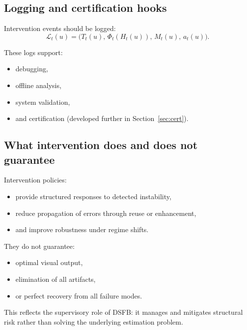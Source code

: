 \documentclass[11pt,letterpaper]{article}
\theoremstyle{gcresult}
\theoremstyle{definition}
\begin{document}

\subsection{Logging and certification hooks}

Intervention events should be logged:
\begin{equation}
\mathcal{L}_t(u)=
\bigl(
T_t(u),\,
\Phi_t(H_t(u)),\,
M_t(u),\,
a_t(u)
\bigr).
\end{equation}

These logs support:
\begin{itemize}[leftmargin=1.5em]
    \item debugging,
    \item offline analysis,
    \item system validation,
    \item and certification (developed further in Section~\ref{sec:cert}).
\end{itemize}


\subsection{What intervention does and does not guarantee}

Intervention policies:
\begin{itemize}[leftmargin=1.5em]
    \item provide structured responses to detected instability,
    \item reduce propagation of errors through reuse or enhancement,
    \item and improve robustness under regime shifts.
\end{itemize}

They do not guarantee:
\begin{itemize}[leftmargin=1.5em]
    \item optimal visual output,
    \item elimination of all artifacts,
    \item or perfect recovery from all failure modes.
\end{itemize}

This reflects the supervisory role of DSFB: it manages and mitigates structural risk rather than solving the underlying estimation problem.
\end{document}
